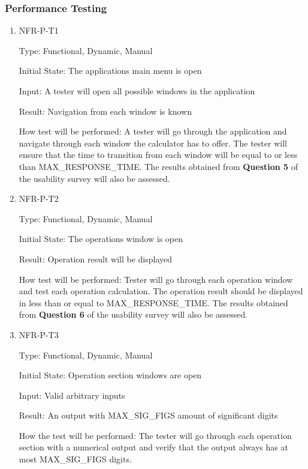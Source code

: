 \documentclass[12pt, titlepage]{article}
\begin{document}
\subsubsection{Performance Testing}
\begin{enumerate}

\item{NFR-P-T1\\}

Type: Functional, Dynamic, Manual 
					
Initial State: The applications main menu is open
					
Input: A tester will open all possible windows in the application
					
Result: Navigation from each window is known
					
How test will be performed: A tester will go through the application and navigate through each window the calculator has to offer. The tester will ensure that the time to transition from each window will be equal to or less than MAX\_RESPONSE\_TIME. The results obtained from \textbf{Question 5} of the usability survey will also be assessed.

\item{NFR-P-T2\\}

Type: Functional, Dynamic, Manual
					
Initial State: The operations window is open
					
Result: Operation result will be displayed
					
How test will be performed: Tester will go through each operation window and test each operation calculation. The operation result should be displayed in less than or equal to MAX\_RESPONSE\_TIME. The results obtained from \textbf{Question 6} of the usability survey will also be assessed.


\item{NFR-P-T3\\}

Type: Functional, Dynamic, Manual
					
Initial State: Operation section windows are open
					
Input: Valid arbitrary inputs
					
Result: An output with MAX\_SIG\_FIGS amount of significant digits

How the test will be performed: The tester will go through each operation section with a numerical output and verify that the output always has at most MAX\_SIG\_FIGS digits. 

\end{enumerate}
\end{document}
